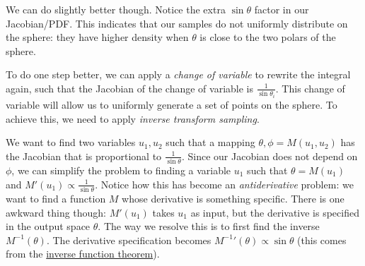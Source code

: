 We can do slightly better though. Notice the extra $\sin\theta$ factor in our Jacobian/PDF. This indicates that our samples do not uniformly distribute on the sphere: they have higher density when $\theta$ is close to the two polars of the sphere.

To do one step better, we can apply a \emph{change of variable} to rewrite the integral again, such that the Jacobian of the change of variable is $\frac{1}{\sin\theta_i}$. This change of variable will allow us to uniformly generate a set of points on the sphere. To achieve this, we need to apply \emph{inverse transform sampling}. 

We want to find two variables $u_1, u_2$ such that a mapping $\theta, \phi = M(u_1, u_2)$ has the Jacobian that is proportional to $\frac{1}{\sin\theta}$. Since our Jacobian does not depend on $\phi$, we can simplify the problem to finding a variable $u_1$ such that $\theta = M(u_1)$ and $M'(u_1) \propto \frac{1}{\sin\theta}$. Notice how this has become an \emph{antiderivative} problem: we want to find a function $M$ whose derivative is something specific. There is one awkward thing though: $M'(u_1)$ takes $u_1$ as input, but the derivative is specified in the output space $\theta$. The way we resolve this is to first find the inverse $M^{-1}(\theta)$. The derivative specification becomes ${M^{-1}}'(\theta) \propto \sin\theta$ (this comes from the \href{https://en.wikipedia.org/wiki/Inverse_function_theorem}{inverse function theorem}). 

